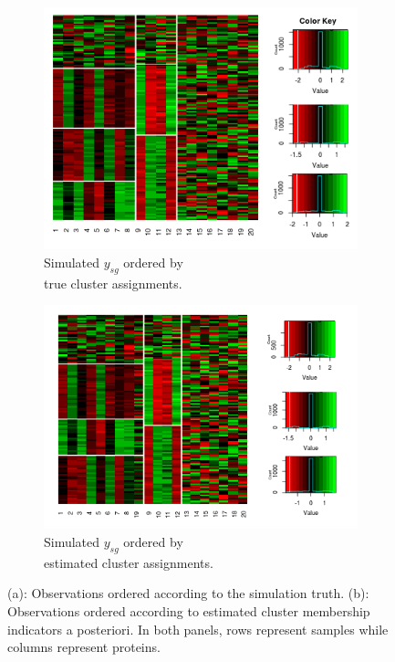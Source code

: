 \begin{figure}[H]
\centering
\begin{subfigure}[b]{0.48\textwidth}
\includegraphics[scale=0.5]{./veera/true_heatmap_nobloc_sim.png} %
\caption{Simulated $y_{sg}$ ordered by \\ true cluster assignments.}
\end{subfigure}
\begin{subfigure}[b]{0.48\textwidth}
\includegraphics[scale=0.5]{./veera/mcmc_heatmap_nobloc_sim.png}
\caption{Simulated $y_{sg}$ ordered by \\ estimated cluster assignments.}
\end{subfigure}
\caption{(a): Observations ordered according to the simulation truth. (b): Observations ordered according to estimated cluster membership indicators a posteriori. In both panels, rows represent samples while columns represent proteins.}
\label{fig:nobloc_sim_fit}
\end{figure} 


